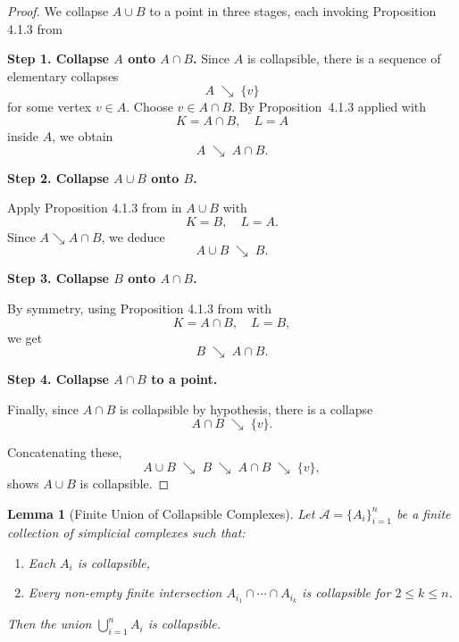 \documentclass[12pt,a4paper,twoside, reqno, tbtags]{article}
\numberwithin{equation}{section}
\newtheorem{lemma}{Lemma}[section]
\begin{document}
\begin{proof}
We collapse \(A\cup B\) to a point in three stages, each invoking Proposition 4.1.3 from \cite{Barmak}

\medskip
\noindent\textbf{Step 1. Collapse \(A\) onto \(A\cap B\).}
Since \(A\) is collapsible, there is a sequence of elementary collapses
\[
  A \;\searrow\; \{v\}
\]
for some vertex \(v\in A\).  Choose \(v\in A\cap B\).  By Proposition~4.1.3 applied with
\[
  K = A\cap B,\quad L = A
\]
inside \(A\), we obtain
\[
  A \;\searrow\; A\cap B.
\]

\medskip
\noindent\textbf{Step 2. Collapse \(A\cup B\) onto \(B\).}

Apply Proposition 4.1.3 from \cite{Barmak} in \(A\cup B\) with
\[
  K = B,\quad L = A.
\]
Since \(A\searrow A\cap B\), we deduce
\[
  A\cup B \;\searrow\; B.
\]

\medskip
\noindent\textbf{Step 3. Collapse \(B\) onto \(A\cap B\).}

By symmetry, using Proposition 4.1.3 from \cite{Barmak} with
\[
  K = A\cap B,\quad L = B,
\]
we get
\[
  B \;\searrow\; A\cap B.
\]

\medskip
\noindent\textbf{Step 4. Collapse \(A\cap B\) to a point.}

Finally, since \(A\cap B\) is collapsible by hypothesis, there is a collapse
\[
  A\cap B \;\searrow\; \{v\}.
\]

\medskip
Concatenating these,
\[
  A\cup B
  \;\searrow\; B
  \;\searrow\; A\cap B
  \;\searrow\; \{v\},
\]
shows \(A\cup B\) is collapsible.
\end{proof}



\begin{lemma}[Finite Union of Collapsible Complexes]
\label{lem:finite-union-collapsible}
Let \( \mathcal{A} = \{A_i\}_{i=1}^n \) be a finite collection of simplicial complexes such that:
\begin{enumerate}
    \item Each \( A_i \) is collapsible,
    \item Every non-empty finite intersection \( A_{i_1} \cap \cdots \cap A_{i_k} \) is collapsible for \(2\leq k\leq n\).
\end{enumerate}
Then the union \( \bigcup_{i=1}^n A_i \) is collapsible.
\end{lemma}
\end{document}

